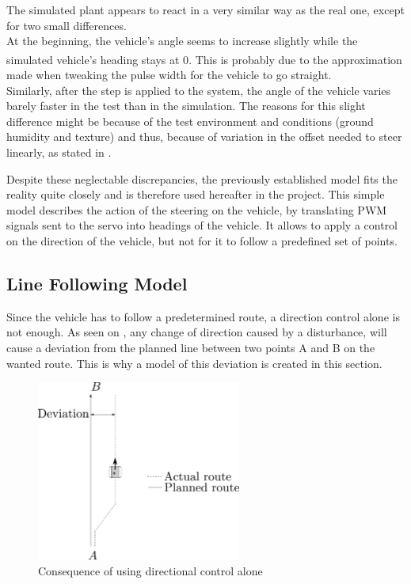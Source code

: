 The simulated plant appears to react in a very similar way as the real one, except for two small differences.\\
At the beginning, the vehicle's angle seems to increase slightly while the simulated vehicle's heading stays at \si{0^{\circ}}. This is probably due to the approximation made when tweaking the pulse width for the vehicle to go straight.\\
Similarly, after the step is applied to the system, the angle of the vehicle varies barely faster in the test than in the simulation. The reasons for this slight difference might be because of the test environment and conditions (ground humidity and texture) and thus, because of variation in the offset needed to steer linearly, as stated in .

Despite these neglectable discrepancies, the previously established model fits the reality quite closely and is therefore used hereafter in the project. This simple model describes the action of the steering on the vehicle, by translating PWM signals sent to the servo into headings of the vehicle. It allows to apply a control on the direction of the vehicle, but not for it to follow a predefined set of points.

\subsection{Line Following Model}
Since the vehicle has to follow a predetermined route, a direction control alone is not enough. As seen on , any change of direction caused by a disturbance, will cause a deviation from the planned line between two points A and B on the wanted route. This is why a model of this deviation is created in this section.

\begin{figure}[H]
	\centering
	\includegraphics[width=0.6\textwidth]{figures/steeringDeviation.pdf}
	\caption{Consequence of using directional control alone}
	\label{SteeringDeviation}
\end{figure}

